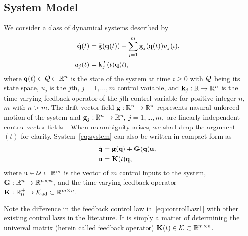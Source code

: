 \documentclass[
12pt,draftcls,onecolumn%
]{IEEEtran}
\begin{document}
\subsection{System Model}
We consider a class of dynamical systems described by 
\begin{subequations}
\label{eq:system}
\begin{align}
\label{eq:systemModel}
\dot{{\bf q}}(t) & = \bar{{\bf g}}({\bf q}(t)) + \sum_{j=1}^m{\bf g}_j({\bf q}(t))u_j(t),\\
\label{eq:controlLaw}
u_j(t) & = {\bf k}_j^T(t) {\bf q}(t), 
\end{align}
\end{subequations}
where ${\bf q}(t)\in{\cal Q}\subset\mathbb{R}^n$ is the state of the system at time $t\ge 0$ with ${\cal Q}$ being its state space, $u_j$ is the $j$th, $j=1,\ldots, m$ control variable, and ${\bf k}_j: \mathbb{R}\to \mathbb{R}^n$ is the time-varying feedback operator of the $j$th control variable for positive integer $n,$ $m$ with $n>m$. The drift vector field $\bar{{\bf g}}:\mathbb{R}^n\to\mathbb{R}^n$ represents natural unforced motion of the system and ${\bf g}_j:\mathbb{R}^n\to\mathbb{R}^n,$ $j=1,\ldots,m,$ are linearly independent control vector fields~\cite{Choset2004}. When no ambiguity arises, we shall drop the argument $(t)$ for clarity. System~\eqref{eq:system} can also be written in compact form as
%
\begin{subequations}
\label{eq:system1}
\begin{align}
\label{eq:systemModel1}
\dot{{\bf q}} & = \bar{{\bf g}}({\bf q}) + {\bf G}({\bf q}){\bf u},\\
\label{eq:controlLaw1}
{\bf u} & = {\bf K}(t) {\bf q}, 
\end{align}
\end{subequations}
%
where ${\bf u}\in{\cal U}\subset \mathbb{R}^m$ is the vector of $m$ control inputs to the system, ${\bf G}:\mathbb{R}^n\to\mathbb{R}^{n\times m},$ and the time varying feedback operator ${\bf K}:\mathbb{R}_0^+\to{\cal K}_{\mathrm{ad}}\subset\mathbb{R}^{m\times n}.$ 


Note the difference in the feedback control law in~\eqref{eq:controlLaw1} with other existing control laws in the literature. It is simply a matter of determining the universal matrix (herein called feedback operator) ${\bf K}(t)\in{\cal K}\subset\mathbb{R}^{m\times n}.$  
\end{document}
